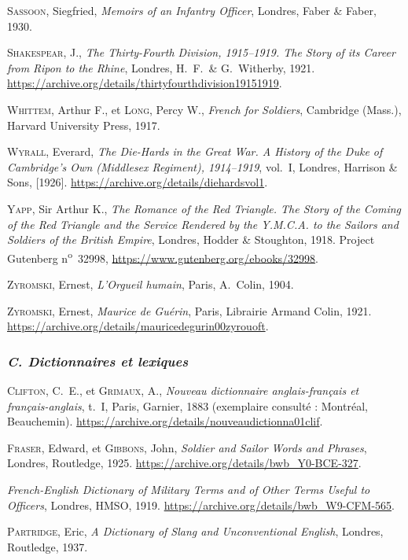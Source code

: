 \begin{biblist}
\item \textsc{Sassoon}, Siegfried, \textit{Memoirs of an Infantry Officer}, Londres, Faber \& Faber, 1930.
\item \textsc{Shakespear}, J., \textit{The Thirty-Fourth Division, 1915--1919. The Story of its Career from Ripon to the Rhine}, Londres, H.~F.~\& G.~Witherby, 1921. \url{https://archive.org/details/thirtyfourthdivision19151919}.
\item \textsc{Whittem}, Arthur F., et \textsc{Long}, Percy W., \textit{French for Soldiers}, Cambridge (Mass.), Harvard University Press, 1917.
\item \textsc{Wyrall}, Everard, \textit{The Die-Hards in the Great War. A History of the Duke of Cambridge's Own (Middlesex Regiment), 1914--1919}, vol.~I, Londres, Harrison \& Sons, [1926]. \url{https://archive.org/details/diehardsvol1}.
\item \textsc{Yapp}, Sir Arthur K., \textit{The Romance of the Red Triangle. The Story of the Coming of the Red Triangle and the Service Rendered by the Y.M.C.A. to the Sailors and Soldiers of the British Empire}, Londres, Hodder \& Stoughton, 1918. Project Gutenberg n\textsuperscript{o}~32998, \url{https://www.gutenberg.org/ebooks/32998}.
\item \textsc{Zyromski}, Ernest, \textit{L'Orgueil humain}, Paris, A.~Colin, 1904.
\item \textsc{Zyromski}, Ernest, \textit{Maurice de Guérin}, Paris, Librairie Armand Colin, 1921. \url{https://archive.org/details/mauricedegurin00zyrouoft}.
\end{biblist}

\subsubsection*{\normalsize\mdseries\itshape C. Dictionnaires et lexiques}

\begin{biblist}
\item \textsc{Clifton}, C.~E., et \textsc{Grimaux}, A., \textit{Nouveau dictionnaire anglais-français et français-anglais}, t.~I, Paris, Garnier, 1883 (exemplaire consulté : Montréal, Beauchemin). \url{https://archive.org/details/nouveaudictionna01clif}.
\item \textsc{Fraser}, Edward, et \textsc{Gibbons}, John, \textit{Soldier and Sailor Words and Phrases}, Londres, Routledge, 1925. \url{https://archive.org/details/bwb_Y0-BCE-327}.
\item \textit{French-English Dictionary of Military Terms and of Other Terms Useful to Officers}, Londres, HMSO, 1919. \url{https://archive.org/details/bwb_W9-CFM-565}.
\item \textsc{Partridge}, Eric, \textit{A Dictionary of Slang and Unconventional English}, Londres, Routledge, 1937.
\end{biblist}

